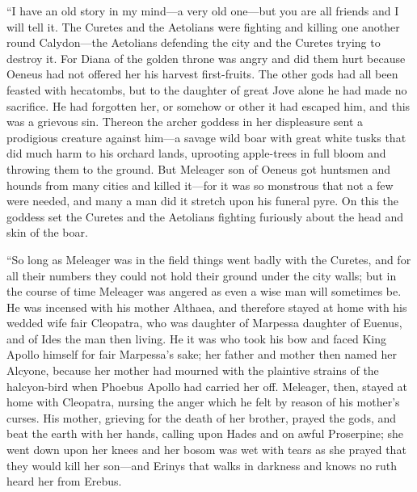 “I have an old story in my mind—a very old one—but you are all
friends and I will tell it. The Curetes and the Aetolians were fighting
and killing one another round Calydon—the Aetolians defending the
city and the Curetes trying to destroy it. For Diana of the golden throne
was angry and did them hurt because Oeneus had not offered her his harvest
first-fruits. The other gods had all been feasted with hecatombs, but to
the daughter of great Jove alone he had made no sacrifice. He had
forgotten her, or somehow or other it had escaped him, and this was a
grievous sin. Thereon the archer goddess in her displeasure sent a
prodigious creature against him—a savage wild boar with great white
tusks that did much harm to his orchard lands, uprooting apple-trees in
full bloom and throwing them to the ground. But Meleager son of Oeneus got
huntsmen and hounds from many cities and killed it—for it was so
monstrous that not a few were needed, and many a man did it stretch upon
his funeral pyre. On this the goddess set the Curetes and the Aetolians
fighting furiously about the head and skin of the boar.

“So long as Meleager was in the field things went badly with the Curetes,
and for all their numbers they could not hold their ground under the city
walls; but in the course of time Meleager was angered as even a wise man
will sometimes be. He was incensed with his mother Althaea, and therefore
stayed at home with his wedded wife fair Cleopatra, who was daughter of
Marpessa daughter of Euenus, and of Ides the man then living. He it was
who took his bow and faced King Apollo himself for fair Marpessa’s sake;
her father and mother then named her Alcyone, because her mother had
mourned with the plaintive strains of the halcyon-bird when Phoebus Apollo
had carried her off. Meleager, then, stayed at home with Cleopatra,
nursing the anger which he felt by reason of his mother’s curses. His
mother, grieving for the death of her brother, prayed the gods, and beat
the earth with her hands, calling upon Hades and on awful Proserpine; she
went down upon her knees and her bosom was wet with tears as she prayed
that they would kill her son—and Erinys that walks in darkness and
knows no ruth heard her from Erebus.

